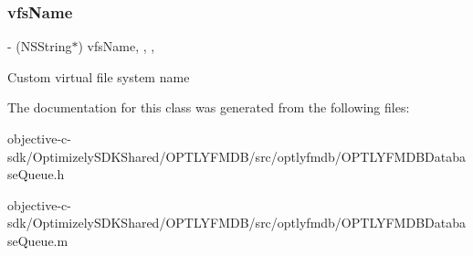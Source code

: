 \subsubsection{\texorpdfstring{vfs\+Name}{vfsName}}
{\footnotesize\ttfamily -\/ (N\+S\+String$\ast$) vfs\+Name\hspace{0.3cm}{\ttfamily [read]}, {\ttfamily [write]}, {\ttfamily [atomic]}, {\ttfamily [copy]}}

Custom virtual file system name 

The documentation for this class was generated from the following files\+:\begin{DoxyCompactItemize}
\item 
objective-\/c-\/sdk/\+Optimizely\+S\+D\+K\+Shared/\+O\+P\+T\+L\+Y\+F\+M\+D\+B/src/optlyfmdb/O\+P\+T\+L\+Y\+F\+M\+D\+B\+Database\+Queue.\+h\item 
objective-\/c-\/sdk/\+Optimizely\+S\+D\+K\+Shared/\+O\+P\+T\+L\+Y\+F\+M\+D\+B/src/optlyfmdb/O\+P\+T\+L\+Y\+F\+M\+D\+B\+Database\+Queue.\+m\end{DoxyCompactItemize}
